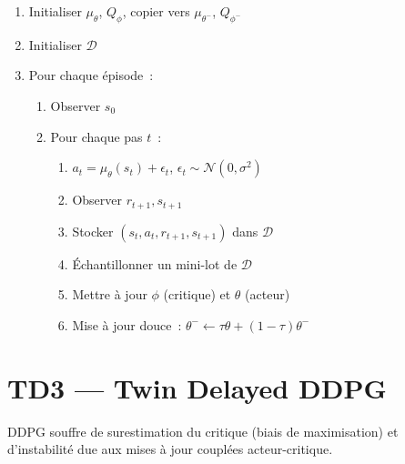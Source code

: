 \begin{algorithme}[title=\textbf{DDPG}]
\begin{enumerate}
    \item Initialiser $\mu_\theta$, $Q_\phi$, copier vers $\mu_{\theta^-}$, $Q_{\phi^-}$
    \item Initialiser $\mathcal{D}$
    \item Pour chaque \'episode~:
    \begin{enumerate}
        \item Observer $s_0$
        \item Pour chaque pas $t$~:
        \begin{enumerate}
            \item $a_t = \mu_\theta(s_t) + \epsilon_t$, $\epsilon_t \sim \mathcal{N}(0, \sigma^2)$
            \item Observer $r_{t+1}, s_{t+1}$
            \item Stocker $(s_t, a_t, r_{t+1}, s_{t+1})$ dans $\mathcal{D}$
            \item \'Echantillonner un mini-lot de $\mathcal{D}$
            \item Mettre \`a jour $\phi$ (critique) et $\theta$ (acteur)
            \item Mise \`a jour douce~: $\theta^- \leftarrow \tau\theta + (1-\tau)\theta^-$
        \end{enumerate}
    \end{enumerate}
\end{enumerate}
\end{algorithme}

\section{TD3 --- Twin Delayed DDPG}

\begin{attention}[title=\textbf{Probl\`emes de DDPG}]
DDPG souffre de surestimation du critique (biais de maximisation) et
d'instabilit\'e due aux mises \`a jour coupl\'ees acteur-critique.
\end{attention}

